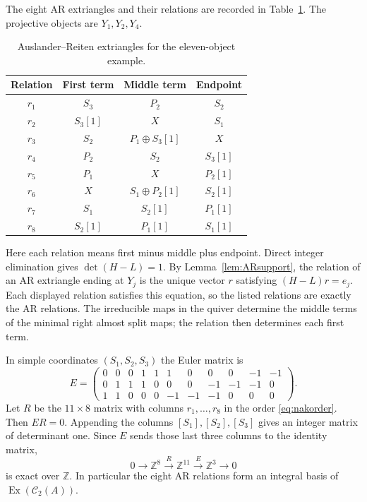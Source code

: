 \documentclass[pdflatex,sn-mathphys-num]{sn-jnl}
\numberwithin{equation}{section}
\theoremstyle{definition}
\theoremstyle{remark}\newtheorem{remark}[theorem]{Remark}
\newcommand{\C}{\mathcal C}
\newcommand{\Ex}{\operatorname{Ex}}
\begin{document}
The eight AR extriangles and their relations are recorded in Table~\ref{tab:meshes}.
The projective objects are $Y_1,Y_2,Y_4$.
\par
\begin{table}[htbp]
\centering
\caption{Auslander--Reiten extriangles for the eleven-object example.}\label{tab:meshes}
\begin{tabular}{cccc}
\toprule
Relation & First term & Middle term & Endpoint\\
\midrule
$r_1$ & $S_3$ & $P_2$ & $S_2$\\
$r_2$ & $S_3[1]$ & $X$ & $S_1$\\
$r_3$ & $S_2$ & $P_1\oplus S_3[1]$ & $X$\\
$r_4$ & $P_2$ & $S_2$ & $S_3[1]$\\
$r_5$ & $P_1$ & $X$ & $P_2[1]$\\
$r_6$ & $X$ & $S_1\oplus P_2[1]$ & $S_2[1]$\\
$r_7$ & $S_1$ & $S_2[1]$ & $P_1[1]$\\
$r_8$ & $S_2[1]$ & $P_1[1]$ & $S_1[1]$\\
\bottomrule
\end{tabular}
\end{table}
\par
Here each relation means first minus middle plus endpoint. Direct
integer elimination gives $\det(H-L)=1$. By
Lemma~\ref{lem:ARsupport}, the relation of an AR extriangle ending
at $Y_j$ is the unique vector $r$ satisfying $(H-L)r=e_j$.
Each displayed relation satisfies this equation, so the listed
relations are exactly the AR relations. The irreducible maps in
the quiver determine the middle terms of the minimal right almost
split maps; the relation then determines each first term.

In simple coordinates $(S_1,S_2,S_3)$ the Euler matrix is
\[
 E=\begin{pmatrix}
 0&0&0&1&1&1&0&0&0&-1&-1\\
 0&1&1&1&0&0&0&-1&-1&-1&0\\
 1&1&0&0&0&-1&-1&-1&0&0&0
 \end{pmatrix}.
\]
Let $R$ be the $11\times8$ matrix with columns $r_1,\ldots,r_8$ in
the order \eqref{eq:nakorder}. Then $ER=0$. Appending the columns
$[S_1],[S_2],[S_3]$ gives an integer matrix of determinant one.
Since $E$ sends those last three columns to the identity matrix,
\[
 0\longrightarrow\mathbb Z^8\xrightarrow{R}\mathbb Z^{11}
 \xrightarrow{E}\mathbb Z^3\longrightarrow0
\]
is exact over $\mathbb Z$. In particular the eight AR relations form an
integral basis of $\Ex(\C_2(A))$.
\end{document}
